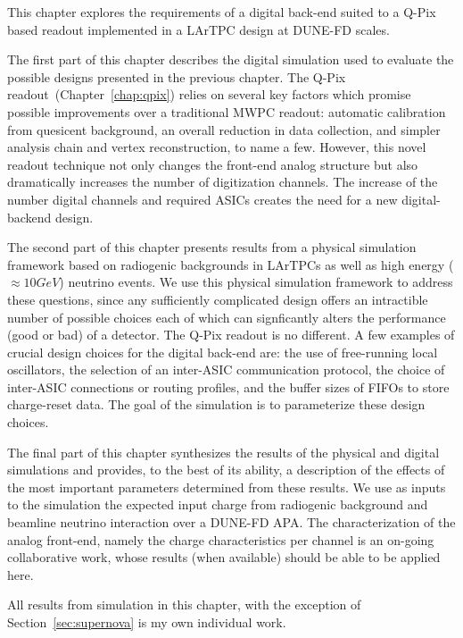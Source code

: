 This chapter explores the requirements of a digital back-end suited to a Q-Pix based readout implemented in a LArTPC design at DUNE-FD scales.

The first part of this chapter describes the digital simulation used to evaluate the possible designs presented in the previous chapter.
The Q-Pix readout~(Chapter~\ref{chap:qpix}) relies on several key factors which promise possible improvements over a traditional MWPC readout: automatic calibration from quesicent background, an overall reduction in data collection, and simpler analysis chain and vertex reconstruction, to name a few.
However, this novel readout technique not only changes the front-end analog structure but also dramatically increases the number of digitization channels.
The increase of the number digital channels and required ASICs creates the need for a new digital-backend design.

The second part of this chapter presents results from a physical simulation framework based on radiogenic backgrounds in LArTPCs as well as high energy ($\approx 10\unit{GeV}$) neutrino events.
We use this physical simulation framework to address these questions, since any sufficiently complicated design offers an intractible number of possible choices each of which can signficantly alters the performance (good or bad) of a detector.
The Q-Pix readout is no different.
A few examples of crucial design choices for the digital back-end are: the use of free-running local oscillators, the selection of an inter-ASIC communication protocol, the choice of inter-ASIC connections or routing profiles, and the buffer sizes of FIFOs to store charge-reset data.
The goal of the simulation is to parameterize these design choices.

The final part of this chapter synthesizes the results of the physical and digital simulations and provides, to the best of its ability, a description of the effects of the most important parameters determined from these results.
We use as inputs to the simulation the expected input charge from radiogenic background and beamline neutrino interaction over a DUNE-FD APA.
The characterization of the analog front-end, namely the charge characteristics per channel is an on-going collaborative work, whose results (when available) should be able to be applied here.

All results from simulation in this chapter, with the exception of Section~\ref{sec:supernova} is my own individual work.







